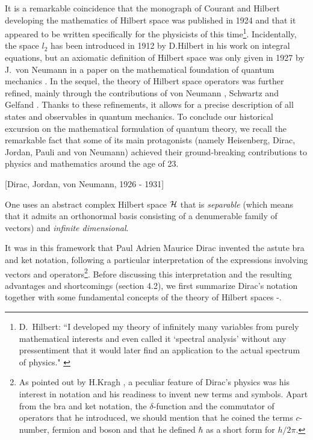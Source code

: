 \documentclass[12pt]{report}
\begin{document}
It is a remarkable coincidence that the monograph of Courant and
Hilbert  \cite{ch} developing the mathematics of  Hilbert space was
published in 1924 and that it appeared to be written 
specifically for the physicists of this time\footnote{D.~Hilbert:
``I developed my theory of
infinitely many variables from purely mathematical interests
and even called it `spectral analysis' without any
pressentiment that it would later find an application
to the actual spectrum of physics." \cite{cr}}.
Incidentally, 
the space $l_2$ has been introduced  
in 1912 by D.Hilbert 
in his work on integral equations, but an axiomatic 
definition of Hilbert space was only given in 1927 by 
J.~von Neumann in a paper on the mathematical foundation 
of quantum mechanics \cite{krey}. 
In the sequel, the theory of Hilbert space operators 
was further  refined, mainly through  the
contributions of 
von Neumann \cite{jvn}, Schwartz \cite{ls} and 
Gelfand \cite{gv}. Thanks to these refinements, it allows 
for a precise description of all states and observables in quantum
mechanics. 
To conclude our historical excursion on the mathematical 
formulation of quantum theory, we recall the remarkable fact 
that some of its main protagonists
(namely Heisenberg, Dirac,
Jordan, Pauli  and von Neumann) achieved their  
ground-breaking contributions to physics and mathematics 
around the age of 23. 


\bigskip
 
 [Dirac, Jordan, von Neumann,
1926 - 1931]

\medskip 

One uses an abstract complex Hilbert space ${\cal H}$
 that is {\em separable}
(which means that it admits an orthonormal basis consisting 
of a denumerable family of vectors)
and {\em infinite dimensional}.  

It was in this framework that Paul Adrien Maurice 
Dirac invented the astute
bra and ket notation, following a particular
interpretation of the expressions involving vectors and 
operators\footnote{As pointed out by H.Kragh \cite{kragh}, 
a peculiar feature 
of Dirac's physics was his interest 
in notation and his readiness to invent new terms 
and symbols. 
Apart from the bra and ket notation, the 
$\delta$-function and the commutator of operators 
that he introduced, we should mention that he coined 
the terms $c$-number, fermion and boson 
and that he defined $\hbar$ as a short form 
for $h /2 \pi$.}.    
Before discussing 
this interpretation and the resulting advantages and shortcomings 
(section 4.2), we first  
summarize Dirac's notation together
with some fundamental concepts  
of the theory of Hilbert spaces \cite{ri,sg}\cite{af}-\cite{krey}.
\end{document}

